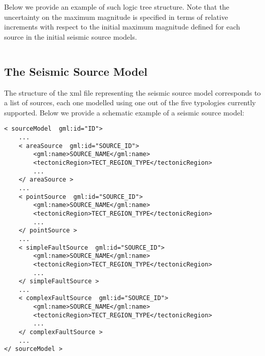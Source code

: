 Below we provide an example of such logic tree structure. Note that the uncertainty on the maximum magnitude is specified in terms of relative increments with respect to the initial maximum magnitude defined for each source in the initial seismic source models.

\inputminted[firstline=1,firstnumber=1,fontsize=\footnotesize,frame=single,linenos,bgcolor=lightgray]{xml}{oqum/hazard/verbatim/input_sslt_simple_lt.xml}

%

\subsection{The Seismic Source Model}

The structure of the xml file representing the seismic source model
corresponds to a list of sources, each one modelled using one out of the five
typologies currently supported. Below we provide a schematic example of a
seismic source model:

\begin{verbatim}
< sourceModel  gml:id="ID">
	...
	< areaSource  gml:id="SOURCE_ID">
		<gml:name>SOURCE_NAME</gml:name>
		<tectonicRegion>TECT_REGION_TYPE</tectonicRegion>
		...
	</ areaSource >
	...
	< pointSource  gml:id="SOURCE_ID">
		<gml:name>SOURCE_NAME</gml:name>
		<tectonicRegion>TECT_REGION_TYPE</tectonicRegion>
		...
	</ pointSource >
	...
	< simpleFaultSource  gml:id="SOURCE_ID">
		<gml:name>SOURCE_NAME</gml:name>
		<tectonicRegion>TECT_REGION_TYPE</tectonicRegion>
		...
	</ simpleFaultSource >
	...
	< complexFaultSource  gml:id="SOURCE_ID">
		<gml:name>SOURCE_NAME</gml:name>
		<tectonicRegion>TECT_REGION_TYPE</tectonicRegion>
		...
	</ complexFaultSource >
	...
</ sourceModel >
\end{verbatim}

%
